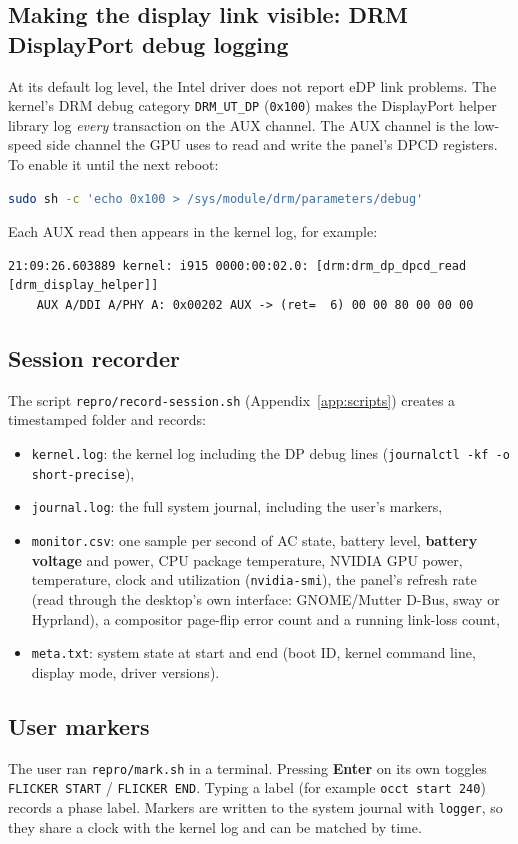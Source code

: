 \documentclass[11pt,a4paper]{article}
\newcommand{\reg}[1]{\texttt{#1}}
\begin{document}
\subsection{Making the display link visible: DRM DisplayPort debug logging}
At its default log level, the Intel driver does not report eDP link problems. The kernel's DRM debug category
\reg{DRM\_UT\_DP} (\reg{0x100}) makes the DisplayPort helper library log \emph{every} transaction on the AUX channel. The AUX
channel is the low-speed side channel the GPU uses to read and write the panel's DPCD registers. To enable it until the next reboot:
\begin{lstlisting}[language=bash]
sudo sh -c 'echo 0x100 > /sys/module/drm/parameters/debug'
\end{lstlisting}
Each AUX read then appears in the kernel log, for example:
\begin{lstlisting}
21:09:26.603889 kernel: i915 0000:00:02.0: [drm:drm_dp_dpcd_read [drm_display_helper]]
    AUX A/DDI A/PHY A: 0x00202 AUX -> (ret=  6) 00 00 80 00 00 00
\end{lstlisting}

\subsection{Session recorder}
The script \reg{repro/record-session.sh} (Appendix~\ref{app:scripts}) creates a timestamped folder and records:
\begin{itemize}
\item \reg{kernel.log}: the kernel log including the DP debug lines (\reg{journalctl -kf -o short-precise}),
\item \reg{journal.log}: the full system journal, including the user's markers,
\item \reg{monitor.csv}: one sample per second of AC state, battery level, \textbf{battery voltage} and power, CPU package temperature,
NVIDIA GPU power, temperature, clock and utilization (\reg{nvidia-smi}), the panel's refresh rate (read through the desktop's own
interface: GNOME/Mutter D-Bus, sway or Hyprland), a compositor page-flip error count and a running link-loss count,
\item \reg{meta.txt}: system state at start and end (boot ID, kernel command line, display mode, driver versions).
\end{itemize}

\subsection{User markers}
The user ran \reg{repro/mark.sh} in a terminal. Pressing \textbf{Enter} on its own toggles \reg{FLICKER START} / \reg{FLICKER END}.
Typing a label (for example \reg{occt start 240}) records a phase label. Markers are written to the system journal with
\reg{logger}, so they share a clock with the kernel log and can be matched by time.
\end{document}

